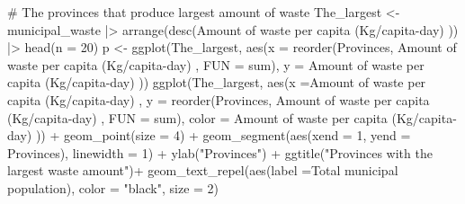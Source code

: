 \documentclass[
  11pt,
  a4paper,
  DIV=11,
  numbers=noendperiod]{scrartcl}
\newenvironment{Shaded}{\begin{snugshade}}{\end{snugshade}}
\newcommand{\AttributeTok}[1]{\textcolor[rgb]{0.40,0.45,0.13}{#1}}
\newcommand{\CommentTok}[1]{\textcolor[rgb]{0.37,0.37,0.37}{#1}}
\newcommand{\DecValTok}[1]{\textcolor[rgb]{0.68,0.00,0.00}{#1}}
\newcommand{\FunctionTok}[1]{\textcolor[rgb]{0.28,0.35,0.67}{#1}}
\newcommand{\NormalTok}[1]{\textcolor[rgb]{0.00,0.23,0.31}{#1}}
\newcommand{\OtherTok}[1]{\textcolor[rgb]{0.00,0.23,0.31}{#1}}
\newcommand{\SpecialCharTok}[1]{\textcolor[rgb]{0.37,0.37,0.37}{#1}}
\newcommand{\StringTok}[1]{\textcolor[rgb]{0.13,0.47,0.30}{#1}}
\begin{document}
\begin{Shaded}
\begin{Highlighting}[]
\CommentTok{\# The provinces that produce largest amount of waste}
\NormalTok{The\_largest }\OtherTok{\textless{}{-}}\NormalTok{ municipal\_waste }\SpecialCharTok{|\textgreater{}} \FunctionTok{arrange}\NormalTok{(}\FunctionTok{desc}\NormalTok{(}\StringTok{\textasciigrave{}}\AttributeTok{Amount of waste per capita (Kg/capita{-}day) }
\StringTok{\textasciigrave{}}\NormalTok{)) }\SpecialCharTok{|\textgreater{}} \FunctionTok{head}\NormalTok{(}\AttributeTok{n =} \DecValTok{20}\NormalTok{)}
\NormalTok{p }\OtherTok{\textless{}{-}} \FunctionTok{ggplot}\NormalTok{(The\_largest, }\FunctionTok{aes}\NormalTok{(}\AttributeTok{x =} \FunctionTok{reorder}\NormalTok{(Provinces, }\StringTok{\textasciigrave{}}\AttributeTok{Amount of waste per capita (Kg/capita{-}day) }
\StringTok{\textasciigrave{}}\NormalTok{, }\AttributeTok{FUN =}\NormalTok{ sum),}
                             \AttributeTok{y =} \StringTok{\textasciigrave{}}\AttributeTok{Amount of waste per capita (Kg/capita{-}day) }
\StringTok{\textasciigrave{}}\NormalTok{))}
\FunctionTok{ggplot}\NormalTok{(The\_largest, }\FunctionTok{aes}\NormalTok{(}\AttributeTok{x =}\StringTok{\textasciigrave{}}\AttributeTok{Amount of waste per capita (Kg/capita{-}day) }
\StringTok{\textasciigrave{}}\NormalTok{, }\AttributeTok{y =} \FunctionTok{reorder}\NormalTok{(Provinces, }\StringTok{\textasciigrave{}}\AttributeTok{Amount of waste per capita (Kg/capita{-}day) }
\StringTok{\textasciigrave{}}\NormalTok{, }\AttributeTok{FUN =}\NormalTok{ sum), }\AttributeTok{color =} \StringTok{\textasciigrave{}}\AttributeTok{Amount of waste per capita (Kg/capita{-}day) }
\StringTok{\textasciigrave{}}\NormalTok{)) }\SpecialCharTok{+}
  \FunctionTok{geom\_point}\NormalTok{(}\AttributeTok{size =} \DecValTok{4}\NormalTok{) }\SpecialCharTok{+}
  \FunctionTok{geom\_segment}\NormalTok{(}\FunctionTok{aes}\NormalTok{(}\AttributeTok{xend =} \DecValTok{1}\NormalTok{, }\AttributeTok{yend =}\NormalTok{ Provinces), }\AttributeTok{linewidth =} \DecValTok{1}\NormalTok{) }\SpecialCharTok{+} 
  \FunctionTok{ylab}\NormalTok{(}\StringTok{"Provinces"}\NormalTok{) }\SpecialCharTok{+}
  \FunctionTok{ggtitle}\NormalTok{(}\StringTok{"Provinces with the largest waste amount"}\NormalTok{)}\SpecialCharTok{+}
  \FunctionTok{geom\_text\_repel}\NormalTok{(}\FunctionTok{aes}\NormalTok{(}\AttributeTok{label =}\StringTok{\textasciigrave{}}\AttributeTok{Total municipal population}\StringTok{\textasciigrave{}}\NormalTok{), }\AttributeTok{color =} \StringTok{"black"}\NormalTok{, }\AttributeTok{size =} \DecValTok{2}\NormalTok{)}
\end{Highlighting}
\end{Shaded}
\end{document}
